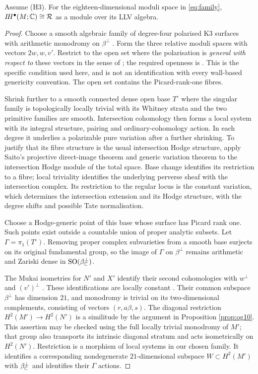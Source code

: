 \begin{theorem}\label{thm:conditional}
Assume (H3). For the eighteen-dimensional moduli space in
\eqref{eq:family}, $I\!H^\bullet(M;\mathbb C)\cong\mathcal R$
as a module over its LLV algebra.
\end{theorem}
\begin{proof}
Choose a smooth algebraic family of degree-four polarised K3
surfaces with arithmetic monodromy on $\beta^\perp$
\cite[Corollary~6.4.7]{huybrechts16}. Form the three relative
moduli spaces with vectors $2w,w,v'$. Restrict to the open
set where the polarisation is \emph{general with respect to}
these vectors in the sense of \cite[Definition~2.8]{pr23};
the required openness is \cite[Proposition~2.14]{pr23}.
This is the specific condition used here, and is not an
identification with every wall-based genericity convention.
The open set contains the Picard-rank-one fibres.

Shrink further to a smooth connected dense open base $T^\circ$
where the singular family is topologically locally trivial
with its Whitney strata \cite[Corollaire~(5.1)]{verdier76}
and the two primitive families are smooth. Intersection
cohomology then forms a local system with its integral
structure, pairing and ordinary-cohomology action. In each
degree it underlies a polarizable pure variation after a
further shrinking. To justify that its fibre structure is the
usual intersection Hodge structure, apply Saito's projective
direct-image theorem and generic variation theorem
\cite[Th\'eor\`emes~5.3.1 and~5.4.3]{saito88} to the
intersection Hodge module of the total space. Base change
\cite[(4.4.3)]{saito90} identifies its restriction to a fibre;
local triviality identifies the underlying perverse sheaf
with the intersection complex. Its restriction to the regular
locus is the constant variation, which determines the
intersection extension and its Hodge structure, with the
degree shifts and possible Tate normalisation.

Choose a Hodge-generic point of this base whose surface has
Picard rank one. Such points exist outside a countable union
of proper analytic subsets. Let $\Gamma=\pi_1(T^\circ)$.
Removing proper complex subvarieties from a smooth base
surjects on its original fundamental group, so the image of
$\Gamma$ on $\beta^\perp$ remains arithmetic and Zariski
dense in $\operatorname{SO}(\beta^\perp_{\mathbb C})$.

The Mukai isometries for $N'$ and $X'$ identify their second
cohomologies with $w^\perp$ and $(v')^\perp$
\cite[Theorem~1.7]{markman08}. These identifications are
locally constant \cite{ogrady97,markman08,opr24}. Their common
subspace $\beta^\perp$ has dimension $21$, and monodromy is
trivial on its two-dimensional complements, consisting of
vectors $(r,a\beta,s)$. The diagonal restriction
$H^2(M')\to H^2(N')$ is a similitude by the argument in
Proposition \ref{prop:og10}. This assertion may be checked
using the full locally trivial monodromy of $M'$; that group
also transports its intrinsic diagonal stratum and acts
isometrically on $H^2(N')$. Restriction is a morphism of local
systems in our chosen family. It identifies a corresponding
nondegenerate $21$-dimensional subspace $W\subset H^2(M')$
with $\beta^\perp_{\mathbb C}$ and identifies their $\Gamma$ actions.


\end{proof}
